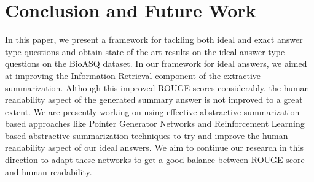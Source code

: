 \documentclass[11pt,a4paper]{article}
\begin{document}



\section{Conclusion and Future Work}
\label{future}
In this paper, we present a framework for tackling both ideal and exact answer type questions and obtain state of the art results on the ideal answer type questions on the BioASQ dataset. In our framework for ideal answers, we aimed at improving the Information Retrieval component of the extractive summarization. Although this improved ROUGE scores considerably, the human readability aspect of the generated summary answer is not improved to a great extent. We are presently working on using effective abstractive summarization based approaches like Pointer Generator Networks \cite{PGC} and Reinforcement Learning based abstractive summarization techniques \cite{salesforce} to try and improve the human readability aspect of our ideal answers. We aim to continue our research in this direction to adapt these networks to get a good balance between ROUGE score and human readability.



%
%



\appendix
\end{document}
